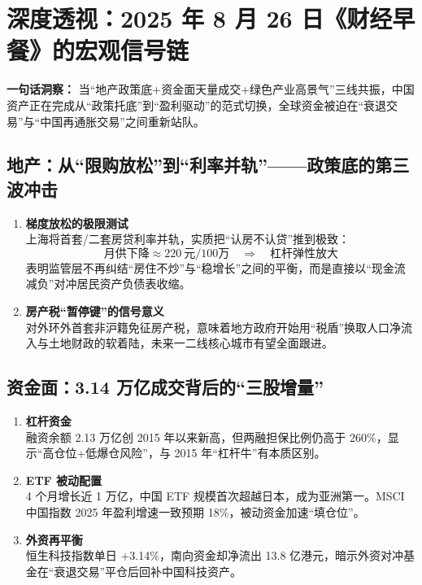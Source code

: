 \section{深度透视：2025 年 8 月 26 日《财经早餐》的宏观信号链}
\textbf{一句话洞察：}  
当“地产政策底+资金面天量成交+绿色产业高景气”三线共振，中国资产正在完成从“政策托底”到“盈利驱动”的范式切换，全球资金被迫在“衰退交易”与“中国再通胀交易”之间重新站队。

\subsection{地产：从“限购放松”到“利率并轨”——政策底的第三波冲击}
\begin{enumerate}[leftmargin=*, nosep]
    \item \textbf{梯度放松的极限测试}  \\
    上海将首套/二套房贷利率并轨，实质把{\color{red}“认房不认贷”}推到极致：  
    \[
        \text{月供下降} \approx 220~\text{元}/100\text{万} \quad\Rightarrow\quad \text{杠杆弹性放大}
    \]  
    表明监管层不再纠结“房住不炒”与“稳增长”之间的平衡，而是直接以“现金流减负”对冲{\color{red}居民资产负债表收缩}。

    \item \textbf{房产税“暂停键”的信号意义}  \\
    对外环外首套非沪籍免征房产税，意味着地方政府开始{\color{red}用“税盾”换取人口净流入与土地财政的软着陆}，未来一二线核心城市有望全面跟进。
\end{enumerate}

\subsection{资金面：3.14 万亿成交背后的“三股增量”}
\begin{enumerate}[leftmargin=*, nosep]
    \item \textbf{杠杆资金}  \\
    融资余额 2.13 万亿创 2015 年以来新高，但{\color{red}两融担保}比例仍高于 260\%，显示“高仓位+低爆仓风险”，与 2015 年“杠杆牛”有本质区别。
    
    \item \textbf{ETF 被动配置}  \\
    4 个月增长近 1 万亿，中国 ETF 规模首次超越日本，成为亚洲第一。MSCI 中国指数 2025 年盈利增速一致预期 18\%，被动资金加速“填仓位”。
    
    \item \textbf{外资再平衡}  \\
    恒生科技指数单日 +3.14\%，南向资金却净流出 13.8 亿港元，暗示外资对冲基金在“衰退交易”平仓后回补中国科技资产。
\end{enumerate}

